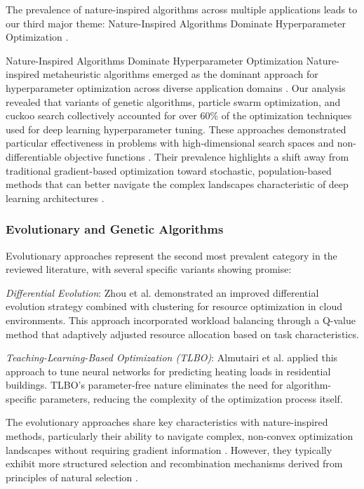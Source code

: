 The prevalence of nature-inspired algorithms across multiple applications leads to our third major theme: Nature-Inspired Algorithms Dominate Hyperparameter Optimization \citep{Eid20223845, Sagu202535, Samadianfard20191934}.

\begin{themebox}{Nature-Inspired Algorithms Dominate Hyperparameter Optimization}
Nature-inspired metaheuristic algorithms emerged as the dominant approach for hyperparameter optimization across diverse application domains \citep{Eid20223845, Sagu202535, Samadianfard20191934}. Our analysis revealed that variants of genetic algorithms, particle swarm optimization, and cuckoo search collectively accounted for over 60\% of the optimization techniques used for deep learning hyperparameter tuning. These approaches demonstrated particular effectiveness in problems with high-dimensional search spaces and non-differentiable objective functions \citep{Yang2019}. Their prevalence highlights a shift away from traditional gradient-based optimization toward stochastic, population-based methods that can better navigate the complex landscapes characteristic of deep learning architectures \citep{LeCun2015}.
\end{themebox}

\subsubsection{Evolutionary and Genetic Algorithms}
Evolutionary approaches represent the second most prevalent category in the reviewed literature, with several specific variants showing promise:

\textit{Differential Evolution}: Zhou et al. \citep{Zhou20211} demonstrated an improved differential evolution strategy combined with clustering for resource optimization in cloud environments. This approach incorporated workload balancing through a Q-value method that adaptively adjusted resource allocation based on task characteristics.

\textit{Teaching-Learning-Based Optimization (TLBO)}: Almutairi et al. \citep{Almutairi20225924} applied this approach to tune neural networks for predicting heating loads in residential buildings. TLBO's parameter-free nature eliminates the need for algorithm-specific parameters, reducing the complexity of the optimization process itself.

The evolutionary approaches share key characteristics with nature-inspired methods, particularly their ability to navigate complex, non-convex optimization landscapes without requiring gradient information \citep{Yang2019}. However, they typically exhibit more structured selection and recombination mechanisms derived from principles of natural selection \citep{Back1996}.


